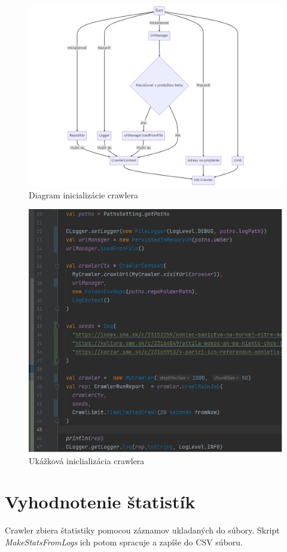 \begin{figure}[!ht]
    \centering
    \includegraphics[width=1\textwidth]{figures/initChart.png}
    \caption{Diagram inicializácie crawlera\label{o:initChart}}
\end{figure}

\begin{figure}[!ht]
    \centering
    \includegraphics[width=.9\textwidth]{figures/crawlInit.png}
    \caption{Ukážková iniclializácia crawlera\label{o:initCrawl2}}
\end{figure}

\section{Vyhodnotenie štatistík}
Crawler zbiera štatistiky pomocou záznamov ukladaných do súbory. Skript \textit{MakeStatsFromLogs} ich potom spracuje a zapíše do CSV súboru. 

